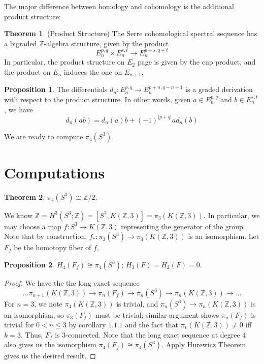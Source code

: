 \documentclass{article}
\theoremstyle{definition}
\newtheorem{theorem}{Theorem}[section]
\theoremstyle{definition}
\theoremstyle{definition}
\newtheorem{proposition}{Proposition}[section]
\theoremstyle{definition}
\theoremstyle{definition}
\theoremstyle{definition}
\theoremstyle{definition}
\begin{document}
The major difference between homology and cohomology is the additional product structure:
\begin{tcolorbox}[colback=red!5!white,colframe=red!30!white]
\begin{theorem}
(Product Structure) The Serre cohomological spectral sequence has a bigraded $\mathbb{Z}$-algebra structure, given by the product 
\[
E_n^{p,q}\times E_n^{s,t}\to E_n ^{p+s,q+t}
\]
In particular, the product structure on $E_2$ page is given by the cup product, and the product on $E_n$ induces the one on $E_{n+1}$.
\end{theorem}
\end{tcolorbox}


\begin{tcolorbox}[colback=blue!5!white,colframe=blue!30!white]
\begin{proposition}
    The differentials $d_n: E_n ^{p,q}\to E_n ^{p+n, q-n+1}$ is a graded derivation with respect to the product structure. In other words, given $a\in E_n ^{p,q}$ and $b\in E_n^{s,t}$, we have 
    \[
        d_n(ab)=d_n(a)b+(-1)^{|p+q|}ad_n(b) 
    \]
\end{proposition}
\end{tcolorbox}
We are ready to compute $\pi_4(S^3)$.

\section{Computations}

\begin{tcolorbox}[colback=red!5!white,colframe=red!30!white]
\begin{theorem}
    $\pi_4(S^3)\cong \mathbb{Z}/2$.
\end{theorem}
\end{tcolorbox}
We know $\mathbb{Z}=H^3(S^3;\mathbb{Z})=[S^3,K(\mathbb{Z},3)]=\pi_3(K(\mathbb{Z},3))$. In particular, we may choose a map $f: S^3\to K(\mathbb{Z},3)$ representing the generator of the group. Note that by construction, $f_*: \pi_3(S^3)\to \pi_3(K(\mathbb{Z},3))$ is an isomorphism. Let $F_f$ be the homotopy fiber of $f$,

\begin{tcolorbox}[colback=blue!5!white,colframe=blue!30!white]
\begin{proposition}
$H_4(F_f)\cong \pi_4(S^3)$; $H_3(F)=H_2(F)=0$.
\end{proposition}
\end{tcolorbox}

\begin{proof}
We have the the long exact sequence 
\[ ...\pi_{n+1}(K(\mathbb{Z},3))\to\pi_n(F_f)\to \pi_n(S^3)\to \pi_n(K(\mathbb{Z},3))\to...\]
For $n=3$, we note $\pi_{4}(K(\mathbb{Z},3))$ is trivial, and $\pi_n(S^3)\to \pi_n(K(\mathbb{Z},3))$ is an isomorphism, so $\pi_3(F_f)$ must be trivial; similar argument shows $\pi_n(F_f)$ is trivial for $0<n\leq 3$ by corollary $1.1.1$ and the fact that $\pi_k(K(\mathbb{Z},3))\neq 0$ iff $k=3$. Thus, $F_f$ is $3$-connected. Note that the long exact sequence at degree $4$ also gives us the isomorphism $\pi_4(F_f)\cong \pi_4(S^3)$. Apply Hurewicz Theorem gives us the desired result.
\end{proof}
\end{document}
